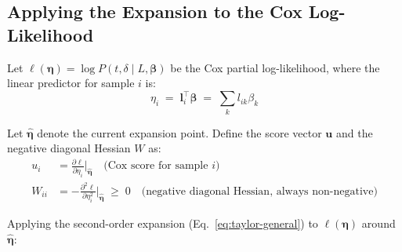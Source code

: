 \documentclass[11pt]{article}
\begin{document}
\subsection{Applying the Expansion to the Cox Log-Likelihood}

Let $\ell(\bm{\eta}) = \log P(t, \delta \mid L, \bm{\beta})$ be the Cox partial
log-likelihood, where the linear predictor for sample $i$ is:
\begin{equation}\label{eq:linear-predictor}
  \eta_i \;=\; \bm{l}_i^{\top}\bm{\beta} \;=\; \sum_k l_{ik}\beta_k
\end{equation}

Let $\hat{\bm{\eta}}$ denote the current expansion point.  Define the score
vector $\mathbf{u}$ and the negative diagonal Hessian $W$ as:
\begin{align}
  u_i &= \frac{\partial \ell}{\partial \eta_i}\bigg|_{\hat{\bm{\eta}}}
        \quad\text{(Cox score for sample }i\text{)} \\
  W_{ii} &= -\frac{\partial^2 \ell}{\partial \eta_i^2}\bigg|_{\hat{\bm{\eta}}}
           \;\geq\; 0
           \quad\text{(negative diagonal Hessian, always non-negative)}
\end{align}

Applying the second-order expansion (Eq.~\eqref{eq:taylor-general}) to
$\ell(\bm{\eta})$ around $\hat{\bm{\eta}}$:
\end{document}
